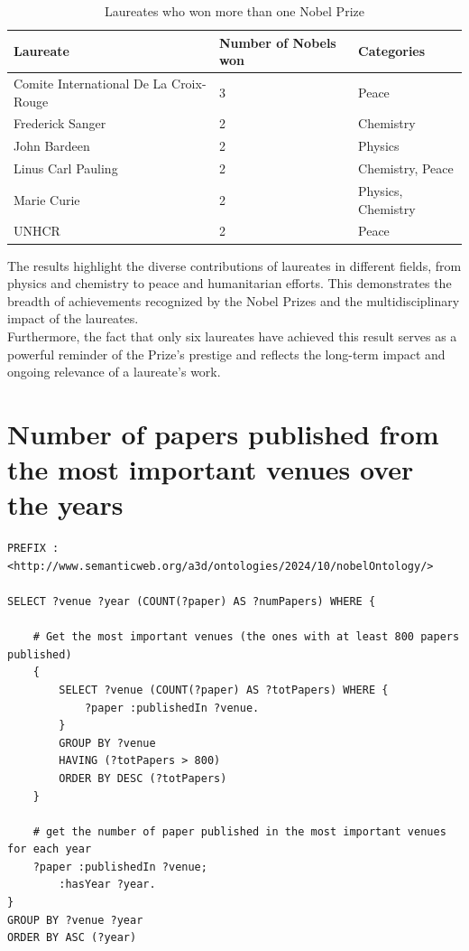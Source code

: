 \documentclass{article}
\begin{document}
\begin{table}[H]
	\caption{Laureates who won more than one Nobel Prize}
	\centering
	\begin{tabular}{|l|l|l|}
		\hline
		\textbf{Laureate}                      & \textbf{Number of Nobels won} & \textbf{Categories} \\ \hline
		Comite International De La Croix-Rouge & 3                             & Peace               \\ \hline
		Frederick Sanger                       & 2                             & Chemistry           \\ \hline
		John Bardeen                           & 2                             & Physics             \\ \hline
		Linus Carl Pauling                     & 2                             & Chemistry, Peace    \\ \hline
		Marie Curie                            & 2                             & Physics, Chemistry  \\ \hline
		UNHCR                                  & 2                             & Peace               \\ \hline
	\end{tabular}
	\label{tab:moreThanOneNobel}
\end{table}

The results highlight the diverse contributions of laureates in different fields, from physics and chemistry to peace and humanitarian efforts. This demonstrates the breadth of achievements recognized by the Nobel Prizes and the multidisciplinary impact of the laureates. \\
Furthermore, the fact that only six laureates have achieved this result serves as a powerful reminder of the Prize's prestige and reflects the long-term impact and ongoing relevance of a laureate’s work.



\section{Number of papers published from the most important venues over the years}

\begin{lstlisting}
PREFIX : <http://www.semanticweb.org/a3d/ontologies/2024/10/nobelOntology/>

SELECT ?venue ?year (COUNT(?paper) AS ?numPapers) WHERE {

    # Get the most important venues (the ones with at least 800 papers published)
    {
        SELECT ?venue (COUNT(?paper) AS ?totPapers) WHERE {
            ?paper :publishedIn ?venue.
        }
        GROUP BY ?venue
        HAVING (?totPapers > 800)
        ORDER BY DESC (?totPapers)
    }

    # get the number of paper published in the most important venues for each year
    ?paper :publishedIn ?venue;
        :hasYear ?year.
}
GROUP BY ?venue ?year
ORDER BY ASC (?year)
\end{lstlisting}
\end{document}
